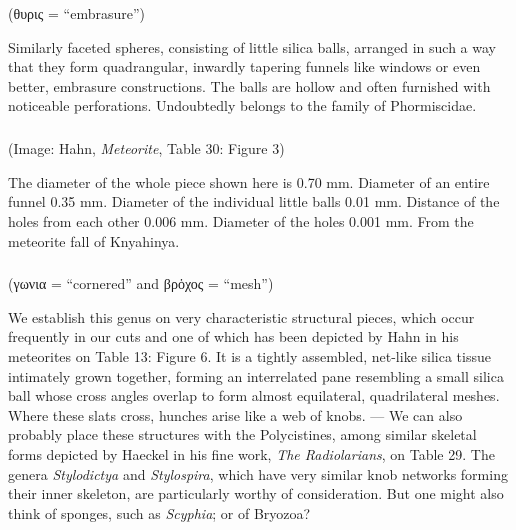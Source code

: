 \documentclass[a4paper, 12pt, oneside]{article}
\begin{document}
\subsubsection{}
\paragraph*{}
(θυρις = ``embrasure'')%

Similarly faceted spheres, consisting of little silica balls, arranged in such a way that they form quadrangular, inwardly tapering funnels like windows or even better, embrasure constructions. The balls are hollow and often furnished with noticeable perforations. Undoubtedly belongs to the family of Phormiscidae.
\paragraph{\large{}}
\subparagraph{}
(Image: Hahn, \emph{Meteorite}, Table 30: Figure 3)

The diameter of the whole piece shown here is 0.70 mm. Diameter of an entire funnel 0.35 mm. Diameter of the individual little balls 0.01 mm. Distance of the holes from each other 0.006 mm. Diameter of the holes 0.001 mm. From the meteorite fall of Knyahinya.
\subsubsection{}
\paragraph*{}
(γωνια = ``cornered'' and βρὁχος = ``mesh'')%

We establish this genus on very characteristic structural pieces, which occur frequently in our cuts and one of which has been depicted by Hahn in his meteorites on Table 13: Figure 6. It is a tightly assembled, net-like silica tissue intimately grown together, forming an interrelated pane resembling a small silica ball whose cross angles overlap to form almost equilateral, quadrilateral meshes. Where these slats cross, hunches arise like a web of knobs. --- We can also probably place these structures with the Polycistines, among similar skeletal forms depicted by Haeckel in his fine work, \emph{The Radiolarians}, on Table 29. The genera \emph{Stylodictya} and \emph{Stylospira}, which have very similar knob networks forming their inner skeleton, are particularly worthy of consideration. But one might also think of sponges, such as \emph{Scyphia}; or of Bryozoa?
\end{document}
